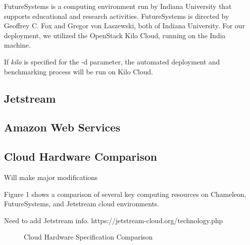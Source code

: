 \documentclass[9pt,twocolumn,twoside]{../../styles/osajnl}
\begin{document}
FutureSystems is a computing environment run by Indiana University that supports educational and research activities. \cite{www-futureSystems} FutureSystems is directed by Geoffrey C. Fox and Gregor von Laszewski, both of Indiana University. \cite{www-fsAbout}  For our deployment, we utilized the OpenStack Kilo Cloud, running on the India machine.

If \emph{kilo} is specified for the -d parameter, the automated deployment and benchmarking process will be run on Kilo Cloud.

\subsection{Jetstream}

\subsection{Amazon Web Services}

\subsection{Cloud Hardware Comparison}


Will make major modifications

Figure 1 shows a comparison of several key computing resources on Chameleon, FutureSystems, and Jetstream cloud environments.

Need to add Jetstream info.
https://jetstream-cloud.org/technology.php

\begin{figure}[ht]
  \caption{Cloud Hardware Specification Comparison} \cite{www-chamHardware} \cite{www-kiloHardware} 
\end{figure}
\end{document}
